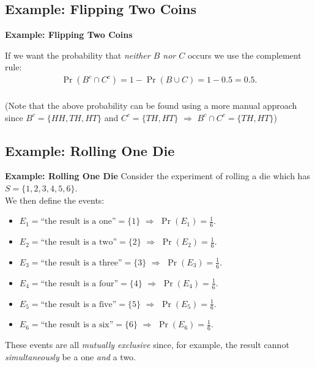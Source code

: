 \documentclass[compress]{beamer}        %
\makeatletter
\newcommand{\tcb}{\textcolor{beamer@blendedblue}}
\makeatother
\begin{document}
\subsection{Example: Flipping Two Coins}
\begin{frame}{\bf \tcb{Example: Flipping Two Coins}}

If we want the probability that \emph{neither $B$ nor $C$} occurs we use the complement rule:
\begin{align*}
\Pr(B^c \cap C^c) = 1 - \Pr(B \cup C) = 1 - 0.5 = 0.5.\\[-0.2cm]
\end{align*}

{\footnotesize(Note that the above probability can be found using a more manual approach since $B^c = \{HH,TH,HT\}$ and $C^c = \{TH,HT\}$ $\Rightarrow$ $B^c \cap C^c = \{TH, HT\}$)}

\end{frame}



\subsection{Example: Rolling One Die}
\begin{frame}{\bf \tcb{Example: Rolling One Die}}
Consider the experiment of rolling a die which has $S = \{1,2,3,4,5,6\}$.\\[0.3cm]

We then define the events:
\begin{itemize}
\item $E_1 = \text{``the result is a one''} = \{1\}$ $\Rightarrow$ $\Pr(E_1) = \tfrac{1}{6}$.
\item $E_2 = \text{``the result is a two''} = \{2\}$ $\Rightarrow$ $\Pr(E_2) = \tfrac{1}{6}$.
\item $E_3 = \text{``the result is a three''} = \{3\}$ $\Rightarrow$ $\Pr(E_3) = \tfrac{1}{6}$.
\item $E_4 = \text{``the result is a four''} = \{4\}$ $\Rightarrow$ $\Pr(E_4) = \tfrac{1}{6}$.
\item $E_5 = \text{``the result is a five''} = \{5\}$ $\Rightarrow$ $\Pr(E_5) = \tfrac{1}{6}$.
\item $E_6 = \text{``the result is a six''} = \{6\}$ $\Rightarrow$ $\Pr(E_6) = \tfrac{1}{6}$.\\[0.5cm]
\end{itemize}

These events are all \emph{mutually exclusive} since, for example, the result cannot \emph{simultaneously} be a one \emph{and} a two.

\end{frame}
\end{document}
